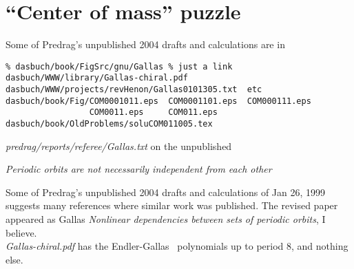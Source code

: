 

\section{``Center of mass'' puzzle}
\label{s:CenterOfMass}

Some of Predrag's unpublished 2004 drafts and calculations are in
\begin{verbatim}
% dasbuch/book/FigSrc/gnu/Gallas % just a link
dasbuch/WWW/library/Gallas-chiral.pdf
dasbuch/WWW/projects/revHenon/Gallas0101305.txt  etc
dasbuch/book/Fig/COM0001011.eps  COM0001101.eps  COM000111.eps
                 COM0011.eps     COM011.eps
dasbuch/book/OldProblems/soluCOM011005.tex
\end{verbatim}

\noindent
{\em predrag/reports/referee/Gallas.txt} on the unpublished

{\em Periodic orbits are not necessarily independent from each other}

\noindent
Some of Predrag's unpublished 2004 drafts and calculations
of Jan 26, 1999 suggests many references where similar work was
published. The revised paper appeared as Gallas {\em
Nonlinear dependencies between sets of periodic orbits}, I believe.
\\

 {{\em Gallas-chiral.pdf}}  has the Endler-Gallas
\HenonMap\ polynomials up to period 8, and nothing else.
\\

